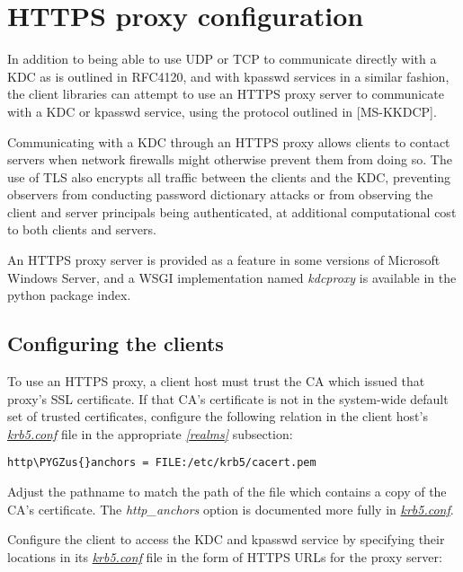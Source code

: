\documentclass[letterpaper,10pt,english]{sphinxmanual}
\def\PYGZus{\char`\_}
\begin{document}
\chapter{HTTPS proxy configuration}
\label{admin/https:https-proxy-configuration}\label{admin/https::doc}\label{admin/https:https}
In addition to being able to use UDP or TCP to communicate directly
with a KDC as is outlined in RFC4120, and with kpasswd services in a
similar fashion, the client libraries can attempt to use an HTTPS
proxy server to communicate with a KDC or kpasswd service, using the
protocol outlined in {[}MS-KKDCP{]}.

Communicating with a KDC through an HTTPS proxy allows clients to
contact servers when network firewalls might otherwise prevent them
from doing so.  The use of TLS also encrypts all traffic between the
clients and the KDC, preventing observers from conducting password
dictionary attacks or from observing the client and server principals
being authenticated, at additional computational cost to both clients
and servers.

An HTTPS proxy server is provided as a feature in some versions of
Microsoft Windows Server, and a WSGI implementation named \emph{kdcproxy}
is available in the python package index.


\section{Configuring the clients}
\label{admin/https:configuring-the-clients}
To use an HTTPS proxy, a client host must trust the CA which issued
that proxy's SSL certificate.  If that CA's certificate is not in the
system-wide default set of trusted certificates, configure the
following relation in the client host's {\hyperref[admin/conf_files/krb5_conf:krb5-conf-5]{\emph{krb5.conf}}} file in
the appropriate {\hyperref[admin/conf_files/krb5_conf:realms]{\emph{{[}realms{]}}}} subsection:

\begin{Verbatim}[commandchars=\\\{\}]
http\PYGZus{}anchors = FILE:/etc/krb5/cacert.pem
\end{Verbatim}

Adjust the pathname to match the path of the file which contains a
copy of the CA's certificate.  The \emph{http\_anchors} option is documented
more fully in {\hyperref[admin/conf_files/krb5_conf:krb5-conf-5]{\emph{krb5.conf}}}.

Configure the client to access the KDC and kpasswd service by
specifying their locations in its {\hyperref[admin/conf_files/krb5_conf:krb5-conf-5]{\emph{krb5.conf}}} file in the form
of HTTPS URLs for the proxy server:
\end{document}
